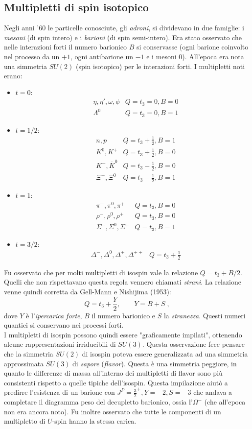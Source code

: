\documentclass[12pt,a4paper]{article}
\theoremstyle{definition}
\numberwithin{equation}{section}
\begin{document}
\subsection{Multipletti di spin isotopico}
Negli anni '60 le particelle conosciute, gli \emph{adroni}, si dividevano in due famiglie: i \emph{mesoni} (di spin intero) e i \emph{barioni} (di spin semi-intero). Era stato osservato che nelle interazioni forti il numero barionico $B$ si conservasse (ogni barione coinvolto nel processo da un $+1$, ogni antibarione un $-1$ e i mesoni $0$). All'epoca era nota una simmetria $SU(2)$ (spin isotopico) per le interazioni forti. I multipletti noti erano:
\begin{itemize}
\item $t=0$: 
\begin{align*}
&\eta,\eta',\omega,\phi &Q=t_3=0,B=0 \\
&\Lambda^0 &Q=t_3=0,B=1
\end{align*}
\item $t=1/2$:
\begin{align*}
&n,p & Q=t_3+\frac{1}{2},B=1 \\
& K^0,K^+ & Q=t_3+\frac{1}{2},B=0 \\
& K^-,\overline{K}^0 &Q=t_3-\frac{1}{2},B=0\\
& \Xi^-,\Xi^0 & Q=t_3-\frac{1}{2},B=1
\end{align*}
\item $t=1$:
\begin{align*}
&\pi^-,\pi^0,\pi^+ &Q=t_3,B=0 \\
&\rho^-,\rho^0,\rho^+ &Q=t_3,B=0 \\
&\Sigma^-,\Sigma^0,\Sigma^+ &Q=t_3,B=1
\end{align*}
\item $t=3/2$:
\begin{align*}
&\Delta^-,\Delta^0,\Delta^+,\Delta^{++} &Q=t_3+\frac{1}{2}
\end{align*}
\end{itemize}
Fu osservato che per molti multipletti di isospin vale la relazione $Q=t_3+B/2$. Quelli che non rispettavano questa regola vennero chiamati \emph{strani}. La relazione venne quindi corretta da Gell-Mann e Nishijima (1953):
\begin{equation}
\boxed{
Q=t_3+\frac{Y}{2}
},\qquad Y=B+S\;,
\end{equation}
dove $Y$ è l'\emph{ipercarica forte}, $B$ il numero barionico e $S$ la \emph{stranezza}. Questi numeri quantici si conservano nei processi forti. \\
I multipletti di isospin possono quindi essere "graficamente impilati", ottenendo alcune rappresentazioni irriducibili di $SU(3)$. Questa osservazione fece pensare che la simmetria $SU(2)$ di isospin poteva essere generalizzata ad una simmetria approssimata $SU(3)$ di \emph{sapore} (\emph{flavor}). Questa è una simmetria peggiore, in quanto le differenze di massa all'interno dei multipletti di flavor sono più consistenti rispetto a quelle tipiche dell'isospin. Questa impilazione aiutò a predirre l'esistenza di un barione con $J^P=\frac{3}{2}^+,Y=-2,S=-3$ che andava a completare il diagramma peso del decupletto barionico, ossia l'$\Omega^-$ (che all'epoca non era ancora noto). Fu inoltre osservato che tutte le componenti di un multipletto di $U$-spin hanno la stessa carica.
\end{document}
